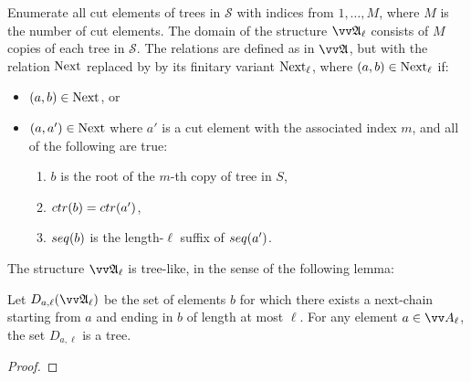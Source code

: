 Enumerate all cut elements of trees in $\mathcal{S}$ with indices from $1, \ldots, M$, where $M$ is the number of cut elements.
The domain of the structure $\unravel{A}_{\ell}$ consists of $M$ copies of each tree in $\mathcal{S}$.
The relations are defined as in $\unravel{A}$, but with the relation $\mathrm{Next}$ replaced by by its finitary variant $\mathrm{Next}_{\ell}$, where $(a,b) \in \mathrm{Next}_{\ell}$ if:
\begin{itemize}
  \item $(a,b) \in \mathrm{Next}$, or
  \item $(a,a') \in \mathrm{Next}$ where $a'$ is a cut element with the associated index $m$, and all of the following are true:
        \begin{enumerate}
          \item $b$ is the root of the $m$-th copy of tree in $S$,
          \item $\ctr{b} = \ctr{a'}$,
          \item $\seq{b}$ is the length-$\ell$ suffix of $\seq{a'}$.
        \end{enumerate}
\end{itemize}

\noindent
The structure $\unravel{A}_{\ell}$ is tree-like, in the sense of the following lemma:
\begin{lemma}\label{lem:companion-tree-like}
  Let $D_{a, \ell}(\unravel{A}_{\ell})$ be the set of elements $b$ for which there exists a next-chain starting from $a$ and ending in $b$ of length at most $\ell$.
  For any element $a \in \unraveldom{A}_{\ell}$, the set $D_{a, \ell}$ is a tree.
\end{lemma}
\begin{proof}
\end{proof}

